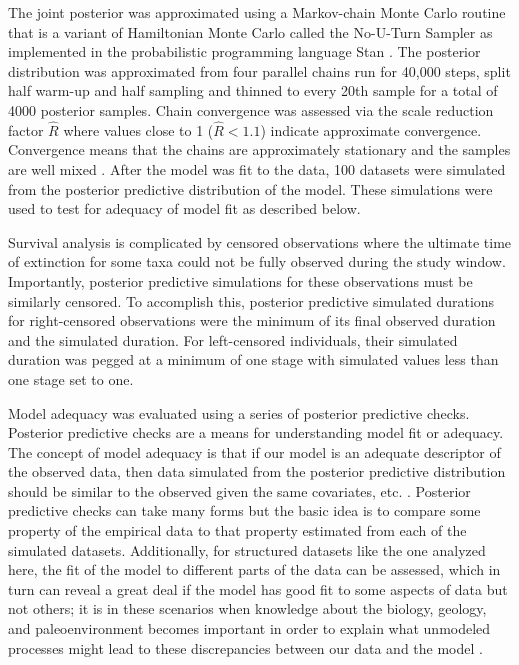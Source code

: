 \documentclass[11pt]{article}
\begin{document}
The joint posterior was approximated using a Markov-chain Monte Carlo routine that is a variant of Hamiltonian Monte Carlo called the No-U-Turn Sampler \citep{Hoffman2014} as implemented in the probabilistic programming language Stan \citep{2014stan}. The posterior distribution was approximated from four parallel chains run for 40,000 steps, split half warm-up and half sampling and thinned to every 20th sample for a total of 4000 posterior samples. Chain convergence was assessed via the scale reduction factor \(\hat{R}\) where values close to 1 (\(\hat{R} < 1.1\)) indicate approximate convergence. Convergence means that the chains are approximately stationary and the samples are well mixed \citep{Gelman2013d}. After the model was fit to the data, 100 datasets were simulated from the posterior predictive distribution of the model. These simulations were used to test for adequacy of model fit as described below.

Survival analysis is complicated by censored observations where the ultimate time of extinction for some taxa could not be fully observed during the study window. Importantly, posterior predictive simulations for these observations must be similarly censored. To accomplish this, posterior predictive simulated durations for right-censored observations were the minimum of its final observed duration and the simulated duration. For left-censored individuals, their simulated duration was pegged at a minimum of one stage with simulated values less than one stage set to one.

Model adequacy was evaluated using a series of posterior predictive checks. Posterior predictive checks are a means for understanding model fit or adequacy. The concept of model adequacy is that if our model is an adequate descriptor of the observed data, then data simulated from the posterior predictive distribution should be similar to the observed given the same covariates, etc. \citep{Gelman2013d}. Posterior predictive checks can take many forms but the basic idea is to compare some property of the empirical data to that property estimated from each of the simulated datasets. Additionally, for structured datasets like the one analyzed here, the fit of the model to different parts of the data can be assessed, which in turn can reveal a great deal if the model has good fit to some aspects of data but not others; it is in these scenarios when knowledge about the biology, geology, and paleoenvironment becomes important in order to explain what unmodeled processes might lead to these discrepancies between our data and the model \citep{Gelman2013d}.
\end{document}
